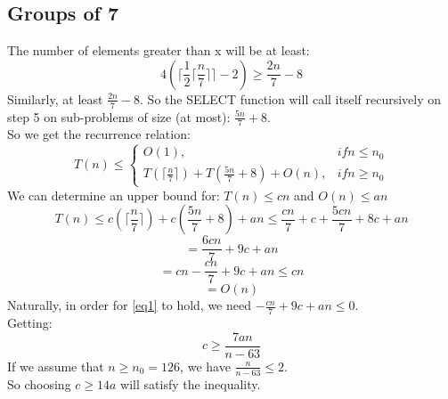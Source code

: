 \subsection*{Groups of 7}
The number of elements greater than x will be at least:
\begin{equation*}
	4(\lceil \frac{1}{2} \lceil \frac{n}{7} \rceil \rceil -2) \geq \frac{2n}{7} - 8
\end{equation*}
Similarly, at least $\frac{2n}{7} - 8$. So the SELECT function will call itself recursively on step 5 on sub-problems of size (at most): $\frac{5n}{7} + 8$.\\

So we get the recurrence relation:
\begin{equation*}
	T(n) \leq \begin{cases} O(1), & if n \leq n_0\\ T(\lceil \frac{n}{7} \rceil) + T(\frac{5n}{7} + 8) + O(n), &if n \geq n_0\end{cases}
\end{equation*}
We can determine an upper bound for: $T(n) \leq cn$  and $O(n) \leq an$
\begin{equation*}
	T(n) \leq c(\lceil \frac{n}{7} \rceil) + c(\frac{5n}{7} + 8) + an \leq \frac{cn}{7} + c + \frac{5cn}{7} + 8c + an
\end{equation*}
\begin{equation*}
	= \frac{6cn}{7} + 9c + an
\end{equation*}
\begin{equation}\label{eq1}
	= cn - \frac{cn}{7} + 9c + an \leq cn
\end{equation}
\begin{equation*}
	= O(n)
\end{equation*}
Naturally, in order for \ref{eq1} to hold, we need $- \frac{cn}{7} + 9c + an \leq 0$.\\
Getting:
\begin{equation*}
	c \geq \frac{7an}{n-63}
\end{equation*}
If we assume that $n \geq n_0 = 126$, we have $\frac{n}{n - 63} \leq 2$.\\
So choosing $c \geq 14a$ will satisfy the inequality.
